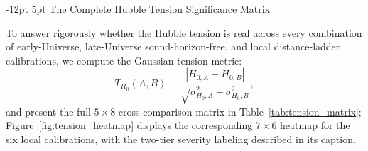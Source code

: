 \documentclass[11pt,letterpaper]{article}
\makeatletter
\renewcommand{\subsection}{\@startsection{subsection}{2}{\z@}%
  {-12pt \@plus -3pt \@minus -1pt}%
  {5pt \@plus 1pt}%
  {\normalfont\large\bfseries\color{tealaccent}}}
\makeatother
\begin{document}
\subsection{The Complete Hubble Tension Significance Matrix}

To answer rigorously whether the Hubble tension is real across every combination of early-Universe, late-Universe sound-horizon-free, and local distance-ladder calibrations, we compute the Gaussian tension metric:
\begin{equation}
    T_{H_0}(A, B) \equiv \frac{\left| H_{0,A} - H_{0,B} \right|}{\sqrt{\sigma_{H_0,A}^2 + \sigma_{H_0,B}^2}},
    \label{eq:tension_metric}
\end{equation}
and present the full $5 \times 8$ cross-comparison matrix in Table~\ref{tab:tension_matrix}; Figure~\ref{fig:tension_heatmap} displays the corresponding $7 \times 6$ heatmap for the six local calibrations, with the two-tier severity labeling described in its caption.
\end{document}
